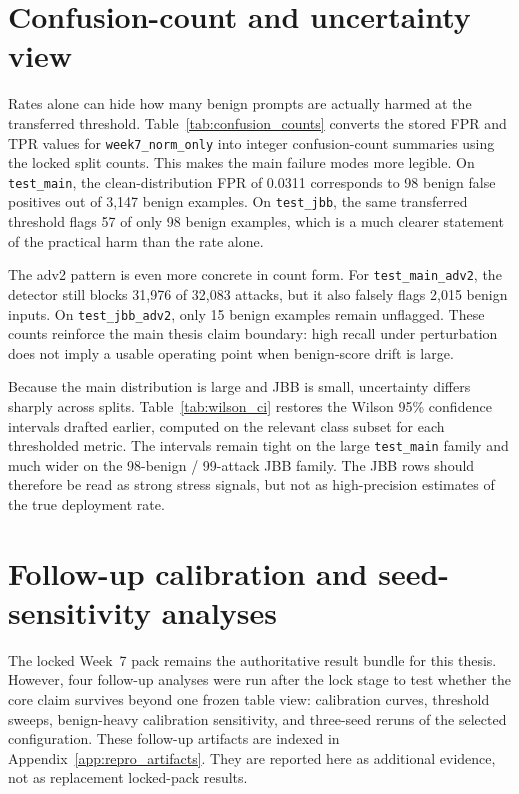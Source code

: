 \section{Confusion-count and uncertainty view}

Rates alone can hide how many benign prompts are actually harmed at the transferred threshold. Table~\ref{tab:confusion_counts} converts the stored FPR and TPR values for \texttt{week7\_norm\_only} into integer confusion-count summaries using the locked split counts. This makes the main failure modes more legible. On \texttt{test\_main}, the clean-distribution FPR of 0.0311 corresponds to 98 benign false positives out of 3,147 benign examples. On \texttt{test\_jbb}, the same transferred threshold flags 57 of only 98 benign examples, which is a much clearer statement of the practical harm than the rate alone.



The adv2 pattern is even more concrete in count form. For \texttt{test\_main\_adv2}, the detector still blocks 31,976 of 32,083 attacks, but it also falsely flags 2,015 benign inputs. On \texttt{test\_jbb\_adv2}, only 15 benign examples remain unflagged. These counts reinforce the main thesis claim boundary: high recall under perturbation does not imply a usable operating point when benign-score drift is large.

Because the main distribution is large and JBB is small, uncertainty differs sharply across splits. Table~\ref{tab:wilson_ci} restores the Wilson 95\% confidence intervals drafted earlier, computed on the relevant class subset for each thresholded metric. The intervals remain tight on the large \texttt{test\_main} family and much wider on the 98-benign / 99-attack JBB family. The JBB rows should therefore be read as strong stress signals, but not as high-precision estimates of the true deployment rate.



\section{Follow-up calibration and seed-sensitivity analyses}

The locked Week~7 pack remains the authoritative result bundle for this thesis. However, four follow-up analyses were run after the lock stage to test whether the core claim survives beyond one frozen table view: calibration curves, threshold sweeps, benign-heavy calibration sensitivity, and three-seed reruns of the selected configuration. These follow-up artifacts are indexed in Appendix~\ref{app:repro_artifacts}. They are reported here as additional evidence, not as replacement locked-pack results.

